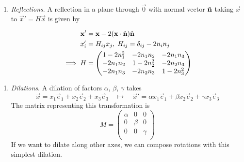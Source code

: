 \documentclass{../../template/note}
\begin{document}
\begin{enumerate}
\begin{enumerate}
            DIAGRAM: perpendicular vectors \(\vec x_\perp\) and \(\hvec n \times \vec x\), angle \(\theta\) between \(\vec x_\perp\) and \(\vec x'_\perp\).

            We denote this (counter-clockwise) rotation by \(\Rot(\theta, \hvec n)\).
            
            
        \end{enumerate}
        \item \emph{Reflections}. A reflection in a plane through \(\vec 0\) with normal vector \(\hvec n\) taking \(\vec x\) to \(\vec x' = H\vec x\) is given by

        \begin{align*}
            \vec x' &= \vec x - 2(\vec x \cdot \hvec n) \hvec n \\
            x_i' &=  H_{ij}x_j, \; H_{ij} = \delta_{ij} - 2n_in_j \\
            \implies H &= \begin{pmatrix}
             1-2n_1^2 & -2n_1n_2 & -2n_1n_3 \\
             -2n_1n_2 & 1-2n_2^2 & -2n_2n_3 \\
             -2n_1n_3 & -2n_2n_3 & 1-2n_3^2 \\
            \end{pmatrix}
        \end{align*}        
    \end{enumerate}
    

    \begin{enumerate}[resume]
        \item \emph{Dilations}. A dilation of factors \(\alpha\), \(\beta\), \(\gamma\) takes
        \[
            \vec x = x_1 \vec e_1 + x_2 \vec e_2 + x_3 \vec e_3 \quad \longmapsto \quad \vec x' = \alpha x_1 \vec e_1 + \beta x_2 \vec e_2 + \gamma x_3 \vec e_3
        \]
        The matrix representing this transformation is
        \[
            M = \begin{pmatrix}
             \alpha & 0 & 0 \\
             0 & \beta & 0 \\
             0 & 0 & \gamma \\
            \end{pmatrix}
        \]
        If we want to dilate along other axes, we can compose rotations with this simplest dilation.
    \end{enumerate}
    
\end{document}

